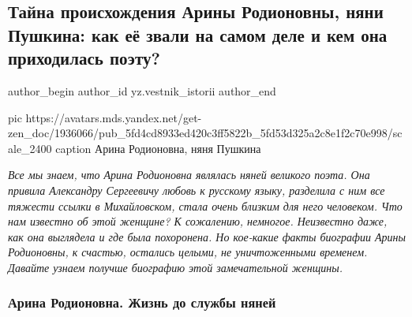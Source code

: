  
 
 
 
 
 
\subsection{Тайна происхождения Арины Родионовны, няни Пушкина: как её звали на самом деле и кем она приходилась поэту?}
\label{sec:13_12_2020.sites.ru.zen_yandex.yz.vestnik_istorii.1.njanja_pushkina}
\ifcmt
	author_begin
   author_id yz.vestnik_istorii
	author_end
\fi


\ifcmt
pic https://avatars.mds.yandex.net/get-zen_doc/1936066/pub_5fd4cd8933ed420c3ff5822b_5fd53d325a2c8e1f2c70e998/scale_2400
caption Арина Родионовна, няня Пушкина
\fi
\begin{leftbar}
	\begingroup
		\em Все мы знаем, что Арина Родионовна являлась няней великого поэта. Она привила
Александру Сергеевичу любовь к русскому языку, разделила с ним все тяжести
ссылки в Михайловском, стала очень близким для него человеком. Что нам известно
об этой женщине? К сожалению, немногое. Неизвестно даже, как она выглядела и
где была похоронена. Но кое-какие факты биографии Арины Родионовны, к счастью,
остались целыми, не уничтоженными временем. Давайте узнаем получше биографию
этой замечательной женщины.
	\endgroup
\end{leftbar}

\subsubsection{Арина Родионовна. Жизнь до службы няней}

